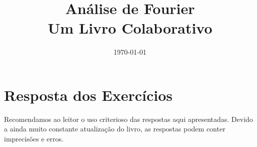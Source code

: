 \documentclass[12pt]{book}
\begin{document}
\frontmatter
\title{Análise de Fourier\\\small{Um Livro Colaborativo}}
\date{\today}
\author{}
\maketitle






\ifishtml
\else
\tableofcontents
\fi

\mainmatter











\appendix



\chapter*{Resposta dos Exercícios}
Recomendamos ao leitor o uso criterioso das respostas aqui apresentadas. Devido a ainda muito constante atualização do livro, as respostas podem conter imprecisões e erros.
\shipoutAnswer  



\end{document}
